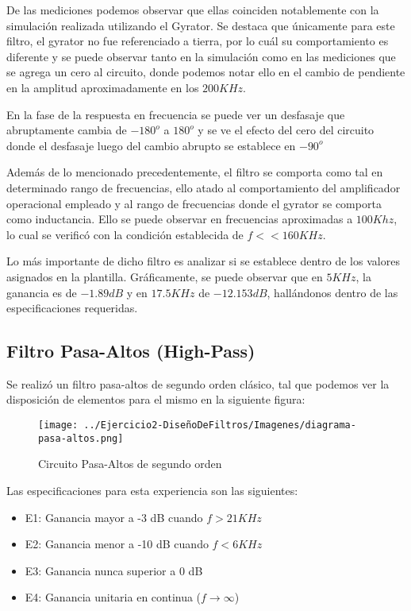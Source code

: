 De las mediciones podemos observar que ellas coinciden notablemente con la simulación realizada utilizando el Gyrator.
Se destaca que únicamente para este filtro, el gyrator no fue referenciado a tierra, por lo cuál su comportamiento es diferente y se puede
observar tanto en la simulación como en las mediciones que se agrega un cero al circuito, donde podemos notar ello en el cambio de pendiente
en la amplitud aproximadamente en los $200KHz$.

En la fase de la respuesta en frecuencia se puede ver un desfasaje que abruptamente cambia de $-180^o$ a $180^o$ y se ve el efecto del cero del circuito donde
el desfasaje luego del cambio abrupto se establece en $-90^o$


Además de lo mencionado precedentemente, el filtro se comporta como tal en determinado rango de frecuencias, ello atado al comportamiento del amplificador operacional
empleado y al rango de frecuencias donde el gyrator se comporta como inductancia. Ello se puede observar en frecuencias aproximadas a $100 Khz$, lo cual 
se verificó con la condición establecida de $f << 160 KHz$.


Lo más importante de dicho filtro es analizar si se establece dentro de los valores asignados en la plantilla. Gráficamente, se puede observar
que en $5 KHz$, la ganancia es de $-1.89 dB$ y en $17.5 KHz$ de $-12.153 dB$, hallándonos dentro de las especificaciones requeridas.

\subsection{Filtro Pasa-Altos (High-Pass)}

Se realizó un filtro pasa-altos de segundo orden clásico, tal que podemos
ver la disposición de elementos para el mismo en la siguiente figura:

\begin{figure}[H]
    \centering
    \texttt{[image: ../Ejercicio2-DiseñoDeFiltros/Imagenes/diagrama-pasa-altos.png]}
    \caption{Circuito Pasa-Altos de segundo orden}
\end{figure}

Las especificaciones para esta experiencia son las siguientes:

\begin{itemize}
	\item E1: Ganancia mayor a -3 dB cuando $f > 21 KHz$ 
	\item E2: Ganancia menor a -10 dB cuando $f < 6 KHz $
	\item E3: Ganancia nunca superior a 0 dB
	\item E4: Ganancia unitaria en continua ($f \to \infty$)
\end{itemize}

